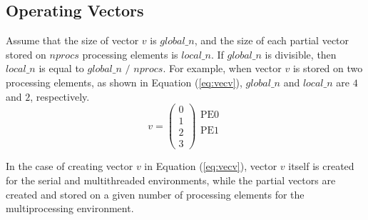 \documentclass[a4paper]{article}
\begin{document}
\subsection{Operating Vectors}
Assume that the size of vector $v$ is $global\_n$, and the size 
of each partial vector stored on $nprocs$ processing elements is $local\_n$. 
If $global\_n$ is divisible, 
then $local\_n$ is equal to $global\_n$ $/$ $nprocs$. 
For example, when vector $v$ is stored on two processing elements, 
as shown in Equation (\ref{eq:vecv}), $global\_n$ and $local\_n$ 
are $4$ and $2$, respectively.
\begin{equation}
v = 
\left(
\begin{array}{c}
0 \\
1 \\ \hline
2 \\
3  
\end{array}
\right)
\begin{array}{l}
\mbox{PE0} \\
    \\
\mbox{PE1} \\
   \\ 
\end{array}
\label{eq:vecv}
\end{equation}

In the case of creating vector $v$ in Equation (\ref{eq:vecv}), 
vector $v$ itself is created for the serial and multithreaded environments, while 
the partial vectors are created and stored on a given number of processing elements
for the multiprocessing environment.
 
\end{document}
